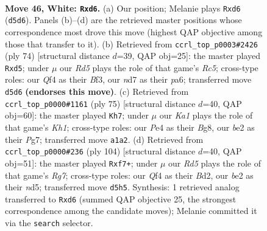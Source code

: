 \documentclass[11pt]{article}
\begin{document}
\clearpage

\begin{figure}[p]\centering
\begin{subfigure}{0.46\textwidth}\centering
\resizebox{\linewidth}{!}{%
\newchessgame
\chessboard[
  setfen={3k4/1p1n4/3p4/3R4/1r2PQ2/8/4b1PP/K7 w - - 0 46},
  showmover=false,
  pgfstyle=straightmove, color=movearrow, markmove={d5-d6}
]}
\caption{}
\end{subfigure}\hfill
\begin{subfigure}{0.46\textwidth}\centering
\resizebox{\linewidth}{!}{%
\newchessgame
\chessboard[
  setfen={8/6bp/pk6/2Rp1r2/8/1P2KB1P/2P5/8 w - - 8 38},
  showmover=false,
  pgfstyle=straightmove, color=movearrow, markmove={c5-d5}
]}
\caption{}
\end{subfigure}
\\[4pt]
\begin{subfigure}{0.46\textwidth}\centering
\resizebox{\linewidth}{!}{%
\newchessgame
\chessboard[
  setfen={R5bk/6p1/7p/2p4P/P7/r3N1P1/4K3/8 b - - 1 38},
  showmover=false,
  pgfstyle=straightmove, color=movearrow, markmove={h8-h7}
]}
\caption{}
\end{subfigure}\hfill
\begin{subfigure}{0.46\textwidth}\centering
\resizebox{\linewidth}{!}{%
\newchessgame
\chessboard[
  setfen={8/1p1k1pR1/7P/p2n4/8/7r/1P1B4/K7 w - - 13 53},
  showmover=false,
  pgfstyle=straightmove, color=movearrow, markmove={g7-f7}
]}
\caption{}
\end{subfigure}
\caption{\textbf{Move 46, White: \texttt{Rxd6}.} (a) Our position; Melanie plays \texttt{Rxd6} (\texttt{d5d6}). Panels (b)--(d) are the retrieved master positions whose correspondence most drove this move (highest QAP objective among those that transfer to it). (b) Retrieved from \texttt{ccrl\_top\_p0003\#2426} (ply 74) [structural distance $d$=39, QAP obj=25]: the master played \texttt{Rxd5}; under $\mu$ our \emph{Rd5} plays the role of that game's \emph{Rc5}; cross-type roles: our \emph{Q}f4 as their \emph{B}f3, our \emph{n}d7 as their \emph{p}a6; transferred move \texttt{d5d6} \textbf{(endorses this move)}. (c) Retrieved from \texttt{ccrl\_top\_p0000\#1161} (ply 75) [structural distance $d$=40, QAP obj=60]: the master played \texttt{Kh7}; under $\mu$ our \emph{Ka1} plays the role of that game's \emph{Kh1}; cross-type roles: our \emph{P}e4 as their \emph{B}g8, our \emph{b}e2 as their \emph{P}g7; transferred move \texttt{a1a2}. (d) Retrieved from \texttt{ccrl\_top\_p0000\#236} (ply 104) [structural distance $d$=40, QAP obj=51]: the master played \texttt{Rxf7+}; under $\mu$ our \emph{Rd5} plays the role of that game's \emph{Rg7}; cross-type roles: our \emph{Q}f4 as their \emph{B}d2, our \emph{b}e2 as their \emph{n}d5; transferred move \texttt{d5h5}. Synthesis: 1 retrieved analog transferred to \texttt{Rxd6} (summed QAP objective 25, the strongest correspondence among the candidate moves); Melanie committed it via the \texttt{search} selector.}
\label{fig:thought-m90}
\end{figure}
\end{document}

